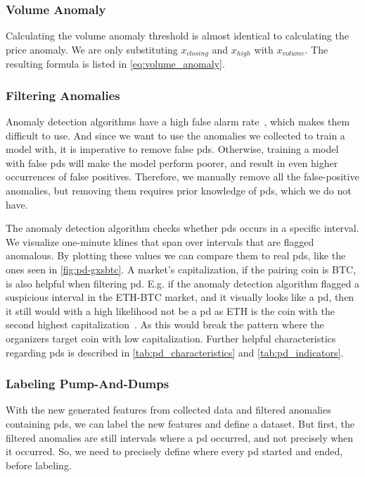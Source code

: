 

\subsubsection{Volume Anomaly}
Calculating the volume anomaly threshold is almost identical to calculating the price anomaly. We are only substituting $x_{closing}$ and $x_{high}$ with $x_{volume}$. The resulting formula is listed in \autoref{eq:volume_anomaly}.



\subsubsection{Filtering Anomalies}
Anomaly detection algorithms have a high false alarm rate~\cite{grill2017reducing}, which makes them difficult to use. And since we want to use the anomalies we collected to train a model with, it is imperative to remove false \acp{pd}. Otherwise, training a model with false \acp{pd} will make the model perform poorer, and result in even higher occurrences of false positives. Therefore, we manually remove all the false-positive anomalies, but removing them requires prior knowledge of \acp{pd}, which we do not have.

The anomaly detection algorithm checks whether \acp{pd} occurs in a specific interval. We visualize one-minute klines that span over intervals that are flagged anomalous. By plotting these values we can compare them to real \acp{pd}, like the ones seen in \autoref{fig:pd-gxsbtc}. A market's capitalization, if the pairing coin is BTC, is also helpful when filtering \ac{pd}. E.g. if the anomaly detection algorithm flagged a suspicious interval in the ETH-BTC market, and it visually looks like a \ac{pd}, then it still would with a high likelihood not be a \ac{pd} as ETH is the coin with the second highest capitalization~\cite{coinmarketcap_eth}.  As this would break the pattern where the organizers target coin with low capitalization. Further helpful characteristics regarding \acp{pd} is described in \autoref{tab:pd_characteristics} and \autoref{tab:pd_indicators}.

\subsubsection{Labeling Pump-And-Dumps}
With the new generated features from collected data and filtered anomalies containing \acp{pd}, we can label the new features and define a dataset. But first, the filtered anomalies are still intervals where a \ac{pd} occurred, and not precisely when it occurred. So, we need to precisely define where every \ac{pd} started and ended, before labeling.

